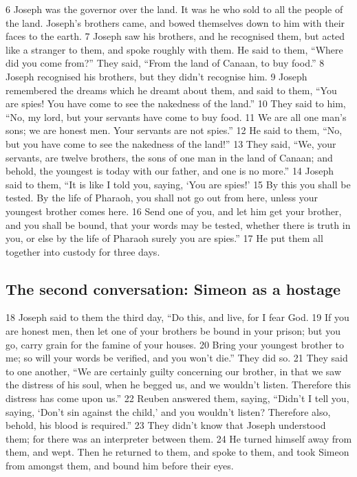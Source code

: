 {6} Joseph was the governor over the land. It was he who sold to all the
people of the land. Joseph's brothers came, and bowed themselves down to
him with their faces to the earth. {7} Joseph saw his brothers, and he
recognised them, but acted like a stranger to them, and spoke roughly
with them. He said to them, ``Where did you come from?'' They said,
``From the land of Canaan, to buy food.'' {8} Joseph recognised his
brothers, but they didn't recognise him. {9} Joseph remembered the
dreams which he dreamt about them, and said to them, ``You are spies!
You have come to see the nakedness of the land.'' {10} They said to him,
``No, my lord, but your servants have come to buy food. {11} We are all
one man's sons; we are honest men. Your servants are not spies.'' {12}
He said to them, ``No, but you have come to see the nakedness of the
land!'' {13} They said, ``We, your servants, are twelve brothers, the
sons of one man in the land of Canaan; and behold, the youngest is today
with our father, and one is no more.'' {14} Joseph said to them, ``It is
like I told you, saying, `You are spies!' {15} By this you shall be
tested. By the life of Pharaoh, you shall not go out from here, unless
your youngest brother comes here. {16} Send one of you, and let him get
your brother, and you shall be bound, that your words may be tested,
whether there is truth in you, or else by the life of Pharaoh surely you
are spies.'' {17} He put them all together into custody for three days.

\hypertarget{the-second-conversation-simeon-as-a-hostage}{%
\subsection{The second conversation: Simeon as a
hostage}\label{the-second-conversation-simeon-as-a-hostage}}

{18} Joseph said to them the third day, ``Do this, and live, for I fear
God. {19} If you are honest men, then let one of your brothers be bound
in your prison; but you go, carry grain for the famine of your houses.
{20} Bring your youngest brother to me; so will your words be verified,
and you won't die.'' They did so. {21} They said to one another, ``We
are certainly guilty concerning our brother, in that we saw the distress
of his soul, when he begged us, and we wouldn't listen. Therefore this
distress has come upon us.'' {22} Reuben answered them, saying, ``Didn't
I tell you, saying, `Don't sin against the child,' and you wouldn't
listen? Therefore also, behold, his blood is required.'' {23} They
didn't know that Joseph understood them; for there was an interpreter
between them. {24} He turned himself away from them, and wept. Then he
returned to them, and spoke to them, and took Simeon from amongst them,
and bound him before their eyes.


